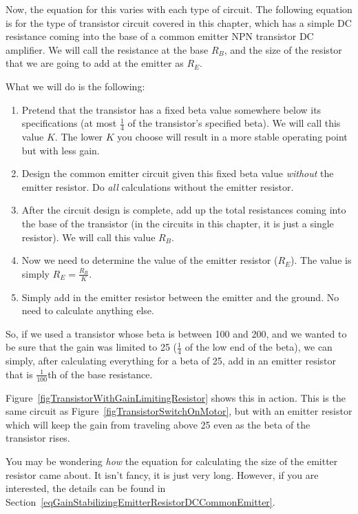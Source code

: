 Now, the equation for this varies with each type of circuit.
The following equation is for the type of transistor circuit covered in this chapter, which has a simple DC resistance coming into the base of a common emitter NPN transistor DC amplifier.
We will call the resistance at the base $R_B$, and the size of the resistor that we are going to add at the emitter as $R_E$.

What we will do is the following:
\begin{enumerate}
\item Pretend that the transistor has a fixed beta value somewhere below its specifications (at most $\frac{1}{4}$ of the transistor's specified beta).  We will call this value $K$.  The lower $K$ you choose will result in a more stable operating point but with less gain.
\item Design the common emitter circuit given this fixed beta value \emph{without} the emitter resistor.  Do \emph{all} calculations without the emitter resistor.
\item After the circuit design is complete, add up the total resistances coming into the base of the transistor (in the circuits in this chapter, it is just a single resistor).  We will call this value $R_B$.
\item Now we need to determine the value of the emitter resistor ($R_E$).  The value is simply $R_E = \frac{R_B}{K}$.
\item Simply add in the emitter resistor between the emitter and the ground.  No need to calculate anything else.
\end{enumerate}

So, if we used a transistor whose beta is between 100 and 200, and we wanted to be sure that the gain was limited to 25 ($\frac{1}{4}$ of the low end of the beta), we can simply, after calculating everything for a beta of 25, add in an emitter resistor that is $\frac{1}{100}$th of the base resistance.

Figure~\ref{figTransistorWithGainLimitingResistor} shows this in action.  
This is the same circuit as Figure~\ref{figTransistorSwitchOnMotor}, but with an emitter resistor which will keep the gain from traveling above 25 even as the beta of the transistor rises.


You may be wondering \emph{how} the equation for calculating the size of the emitter resistor came about.
It isn't fancy, it is just very long.
However, if you are interested, the details can be found in Section~\ref{eqGainStabilizingEmitterResistorDCCommonEmitter}.

